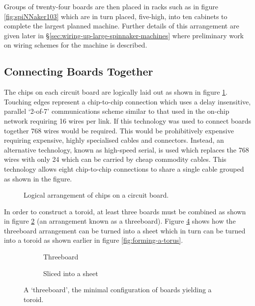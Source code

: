 			Groups of twenty-four boards are then placed in racks such as in figure
			\ref{fig:spiNNaker103} which are in turn placed, five-high, into ten
			cabinets to complete the largest planned machine. Further details of this
			arrangement are given later in
			\S\ref{sec:wiring-up-large-spinnaker-machines} where preliminary work on
			wiring schemes for the machine is described.
		
		\subsection{Connecting Boards Together}
			
			
			The chips on each circuit board are logically laid out as shown in figure
			\ref{fig:chipsOnBoard}. Touching edges represent a chip-to-chip connection
			which uses a delay insensitive, parallel `2-of-7' communications scheme
			similar to that used in the on-chip network requiring 16 wires per link.
			If this technology was used to connect boards together 768 wires would be
			required.  This would be prohibitively expensive requiring expensive,
			highly specialised cables and connectors. Instead, an alternative
			technology, known as high-speed serial, is used which replaces the 768
			wires with only 24 which can be carried by cheap commodity cables. This
			technology allows eight chip-to-chip connections to share a single cable
			grouped as shown in the figure.
			
			\begin{figure}
				\center
				
				\caption{Logical arrangement of chips on a circuit board.}
				\label{fig:chipsOnBoard}
			\end{figure}
			
			In order to construct a toroid, at least three boards must be combined as
			shown in figure \ref{fig:threeboard} (an arrangement known as a
			threeboard).  Figure \ref{fig:threeboardSliced} shows how the threeboard
			arrangement can be turned into a sheet which in turn can be turned into a
			toroid as shown earlier in figure \ref{fig:forming-a-torus}.
			
			\begin{figure}
				\begin{subfigure}[b]{0.45\textwidth}
					\center
					
					\caption{Threeboard}
					\label{fig:threeboard}
				\end{subfigure}
				\begin{subfigure}[b]{0.45\textwidth}
					\center
					
					\caption{Sliced into a sheet}
					\label{fig:threeboardSliced}
				\end{subfigure}
				
				\caption[A `threeboard'.]{A `threeboard', the minimal configuration of
				boards yielding a toroid.}
			\end{figure}
			
